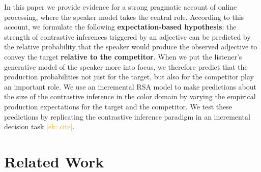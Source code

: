 \documentclass[10pt,letterpaper]{article}
\newcommand{\ek}[1]{\textcolor{Orange}{[ek: #1]}}
\begin{document}


In this paper we provide evidence for a strong pragmatic account of online processing, where the speaker model takes the central role. According to this account, we formulate the following \textbf{expectation-based hypothesis}: the strength of contrastive inferences triggered by an adjective can be predicted by the relative probability that the speaker would produce the observed adjective to convey the target \textbf{relative to the competitor}. When we put the listener's generative model of the speaker more into focus, we therefore predict that the production probabilities not just for the target, but also for the competitor play an important role. We use an incremental RSA model to make predictions about the size of the contrastive inference in the color domain by varying the empirical production expectations for the target and the competitor. We test these predictions by replicating the contrastive inference paradigm in an incremental decision task \ek{cite}.


\section{Related Work}
\end{document}
